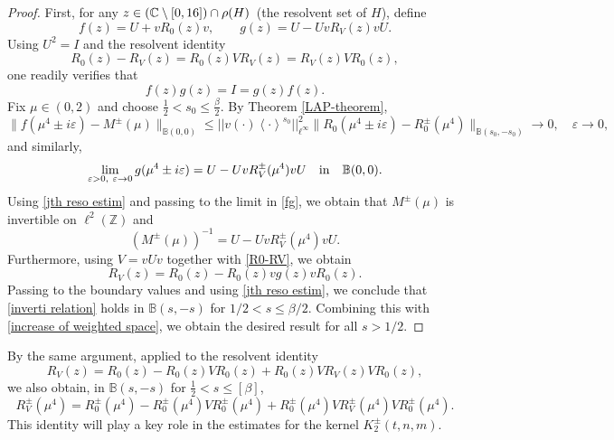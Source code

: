 \documentclass[reqno, 11pt]{amsart}
\newcommand\B{\mathbb{B}}
\newcommand\C{\mathbb{C}}
\numberwithin{equation}{section}
\begin{document}
\begin{proof}
First, for any $z\in {\rm(}\C\setminus[0,16]{\rm)}\cap\rho(H)$~(the resolvent set of $H$), define $$f(z)=U+vR_0(z)v,\qquad g(z)=U-UvR_V(z)vU.$$ 
Using $U^2=I$ and  the resolvent identity 
\begin{equation}\label{R0-RV}
R_0(z)-R_V(z)=R_0(z)VR_V(z)=R_V(z)VR_0(z),
\end{equation}
one readily verifies that
\begin{equation}\label{fg}
f(z)g(z)=I=g(z)f(z).
\end{equation}
Fix $\mu\in(0,2)$ and choose $\frac12<s_0\leq\frac{\beta}{2}$. By Theorem \ref{LAP-theorem},
\begin{equation*}
\| f(\mu^4\pm i\varepsilon)-M^{\pm}(\mu)\|_{\B(0,0)}\leq ||v(\cdot)\left<\cdot\right>^{s_0}||^2_{\ell^{\infty}}\|R_0(\mu^4\pm i\varepsilon)-R^{\pm}_0(\mu^4)\|_{\B(s_0,-s_0)}\rightarrow 0 ,\quad \varepsilon\rightarrow0,
\end{equation*}
and similarly, 
\begin{equation*}
\lim\limits_{\varepsilon>0,\ \varepsilon\rightarrow0}g(\mu^4\pm i\varepsilon)=U-UvR^{\pm}_V(\mu^4)vU\quad {\rm in}\quad \B(0,0).
\end{equation*}
Using \eqref{jth reso estim}  and passing to the limit in \eqref{fg}, we obtain that $M^{\pm}(\mu)$ is invertible on $\ell^2(\mathbb Z)$ and
 $$(M^{\pm}(\mu))^{-1}=U-UvR^{\pm}_V(\mu^4)vU.
 $$
Furthermore, using $V=vUv$ together with \eqref{R0-RV}, we obtain
\begin{equation}
R_{V}(z)=R_0(z)-R_0(z)vg(z)vR_0(z).
\end{equation}
Passing to the boundary values and using \eqref{jth reso estim}, we conclude that \eqref{inverti relation} holds in $\B(s,-s)$ for $1/2<s\leq\beta/2$. Combining this with \eqref{increase of weighted space}, we obtain the desired result for all $s>1/2$.
\end{proof}
By the same argument, applied to the resolvent identity
$$R_V(z)=R_0(z)-R_0(z)VR_0(z)+R_0(z)VR_V(z)VR_0(z),$$
we also obtain, in $\B(s,-s)$ for $\frac12<s\leq[\beta]$,
$$R^{\pm}_V(\mu^4)=R^{\pm}_{0}(\mu^4)-R^{\pm}_{0}(\mu^4)VR^{\pm}_{0}(\mu^4)+R^{\pm}_{0}(\mu^4)VR^{\pm}_V(\mu^4)VR^{\pm}_{0}(\mu^4).$$
This identity will play a key role in the estimates for the kernel $K_2^{\pm}(t,n,m)$.
\end{document}
